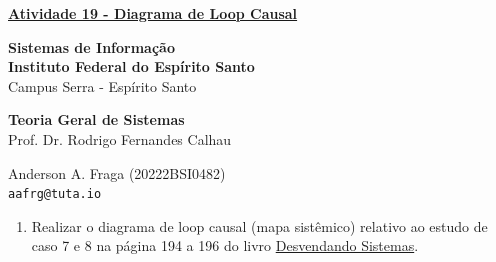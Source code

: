 \documentclass[11pt]{article}
\begin{document}
\underline{\textbf{Atividade 19 - Diagrama de Loop Causal}}\par
\textbf{Sistemas de Informação}\\
\textbf{Instituto Federal do Espírito Santo}\\
Campus Serra - Espírito Santo\par
\textbf{Teoria Geral de Sistemas}\\
Prof. Dr. Rodrigo Fernandes Calhau\par
Anderson A. Fraga (20222BSI0482)\\
\texttt{aafrg@tuta.io}\\  %

\begin{enumerate}
    \item Realizar o diagrama de loop causal (mapa sistêmico) relativo ao estudo de caso 7 e 8 na página 194 a 196 do livro \href{https://drive.google.com/file/d/1eJU2qK8IzC-S8jRKQuHrIgED1tEvzGOq/view}{Desvendando Sistemas}.


\end{enumerate}
\end{document}

